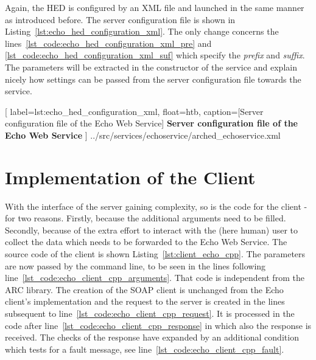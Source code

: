 Again, the HED is configured by an XML file and launched in the same manner as introduced before.
The server configuration file is shown in Listing~\ref{lst:echo_hed_configuration_xml}.
The only change concerns the lines~\ref{lst_code:echo_hed_configuration_xml_pre} and \ref{lst_code:echo_hed_configuration_xml_suf} which specify the \textit{prefix} and \textit{suffix}.
The parameters will be extracted in the constructor of the service and explain nicely how settings can be passed from the server configuration file towards the service.


	[
	label=lst:echo_hed_configuration_xml, float=htb,
	caption={[Server configuration file of the Echo Web Service]
	\textbf{Server configuration file of the Echo Web Service}}
	]
{../src/services/echoservice/arched_echoservice.xml}








\section{Implementation of the Client}

With the interface of the server gaining complexity, so is the code for the client - for two reasons. Firstly, because the additional arguments need to be filled. Secondly, because of the extra effort to interact with the (here human) user to collect the data which needs to be forwarded to the Echo Web Service. The source code of the client is shown Listing~\ref{lst:client_echo_cpp}.
The parameters are now passed by the command line, to be seen in the lines following line~\ref{lst_code:echo_client_cpp_arguments}.
That code is independent from the ARC library.
The creation of the SOAP client is unchanged from the Echo client's implementation and the request to the server is created in the lines subsequent to line~\ref{lst_code:echo_client_cpp_request}.
It is processed in the code after line~\ref{lst_code:echo_client_cpp_response} in which also the response is received.
The checks of the response have expanded by an additional condition which tests for a fault message, see line~\ref{lst_code:echo_client_cpp_fault}.

